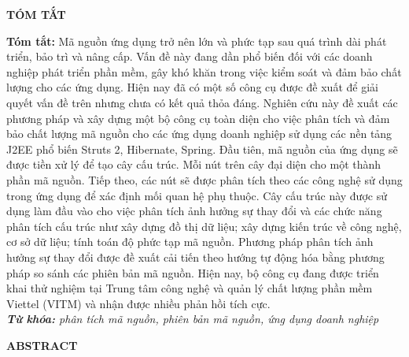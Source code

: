 \documentclass[12pt]{report}
\begin{document}
	
\newpage
\begin{titlepage}
\begin{center}
	\textbf{\large TÓM TẮT}
\end{center}
\textbf{Tóm tắt:} Mã nguồn ứng dụng trở nên lớn và phức tạp sau quá trình dài phát triển, bảo trì và nâng cấp. Vấn đề này đang dần phổ biến đối với các doanh nghiệp phát triển phần mềm, gây khó khăn trong việc kiểm soát và đảm bảo chất lượng cho các ứng dụng. Hiện nay đã có một số công cụ được đề xuất để giải quyết vấn đề trên nhưng chưa có kết quả thỏa đáng. Nghiên cứu này đề xuất các phương pháp và xây dựng một bộ công cụ toàn diện cho việc phân tích và đảm bảo chất lượng mã nguồn cho các ứng dụng doanh nghiệp sử dụng các nền tảng J2EE phổ biến Struts 2, Hibernate, Spring. Đầu tiên, mã nguồn của ứng dụng sẽ được tiền xử lý để tạo cây cấu trúc. Mỗi nút trên cây đại diện cho một thành phần mã nguồn. Tiếp theo, các nút sẽ được phân tích theo các công nghệ sử dụng trong ứng dụng để xác định mối quan hệ phụ thuộc. Cây cấu trúc này được sử dụng làm đầu vào cho việc phân tích ảnh hưởng sự thay đổi và các chức năng phân tích cấu trúc như xây dựng đồ thị dữ liệu; xây dựng kiến trúc về công nghệ, cơ sở dữ liệu; tính toán độ phức tạp mã nguồn. Phương pháp phân tích ảnh hưởng sự thay đổi được đề xuất cải tiến theo hướng tự động hóa bằng phương pháp so sánh các phiên bản mã nguồn. Hiện nay, bộ công cụ đang được triển khai thử nghiệm tại Trung tâm công nghệ và quản lý chất lượng phần mềm Viettel (VITM) và nhận được nhiều phản hồi tích cực.\\

\noindent \textit{\textbf{Từ khóa:} phân tích mã nguồn, phiên bản mã nguồn, ứng dụng doanh nghiệp}
\end{titlepage}

\newpage
\begin{titlepage}
\begin{center}
	\textbf{\large ABSTRACT}
\end{center}
\end{titlepage}
\end{document}
